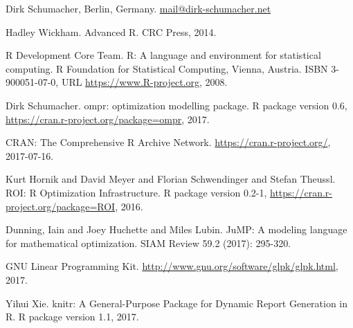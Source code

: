 \documentclass{optima}\usepackage[]{graphicx}\usepackage[]{color}
\begin{document}
\begin{jinfo}
Dirk Schumacher, Berlin, Germany. \href{mailto:mail@dirk-schumacher.net}{\url{mail@dirk-schumacher.net}}

\end{jinfo}

\begin{thebibliography}{3}

Hadley Wickham.
\newblock Advanced R.
\newblock CRC Press, 2014.

 R Development Core Team.
 \newblock R: A language and environment for statistical computing.
 \newblock R Foundation for Statistical Computing, Vienna, Austria. ISBN 3-900051-07-0, URL \url{https://www.R-project.org}, 2008.

Dirk Schumacher.
\newblock ompr: optimization modelling package.
\newblock R package version 0.6, \url{https://cran.r-project.org/package=ompr}, 2017.

CRAN: The Comprehensive R Archive Network.
\newblock \url{https://cran.r-project.org/}, 2017-07-16.

Kurt Hornik and David Meyer and Florian Schwendinger and Stefan Theussl.
\newblock ROI: R Optimization Infrastructure.
\newblock R package version 0.2-1, \url{https://cran.r-project.org/package=ROI}, 2016.

Dunning, Iain and Joey Huchette and Miles Lubin.
\newblock JuMP: A modeling language for mathematical optimization.
\newblock SIAM Review 59.2 (2017): 295-320.

GNU Linear Programming Kit.
\newblock \url{http://www.gnu.org/software/glpk/glpk.html}, 2017.

Yihui Xie.
\newblock knitr: A General-Purpose Package for Dynamic Report Generation in R.
\newblock R package version 1.1, 2017.

\end{thebibliography}
\end{document}
